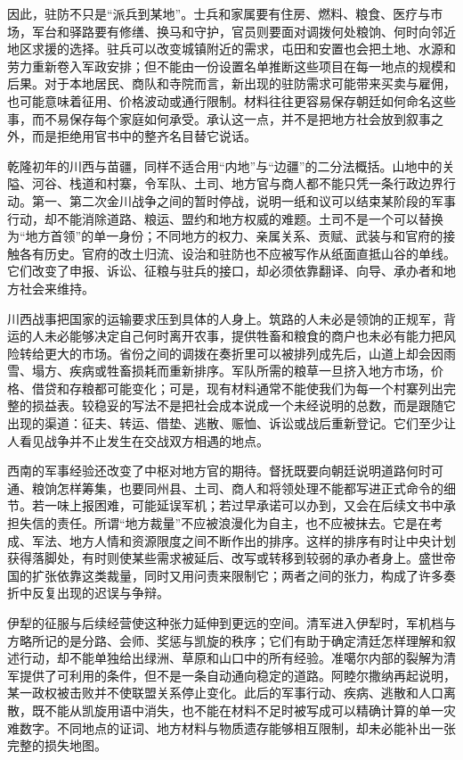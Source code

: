 因此，驻防不只是“派兵到某地”。士兵和家属要有住房、燃料、粮食、医疗与市场，军台和驿路要有修缮、换马和守护，官员则要面对调拨何处粮饷、何时向邻近地区求援的选择。驻兵可以改变城镇附近的需求，屯田和安置也会把土地、水源和劳力重新卷入军政安排；但不能由一份设置名单推断这些项目在每一地点的规模和后果。对于本地居民、商队和寺院而言，新出现的驻防需求可能带来买卖与雇佣，也可能意味着征用、价格波动或通行限制。材料往往更容易保存朝廷如何命名这些事，而不易保存每个家庭如何承受。承认这一点，并不是把地方社会放到叙事之外，而是拒绝用官书中的整齐名目替它说话。

乾隆初年的川西与苗疆，同样不适合用“内地”与“边疆”的二分法概括。山地中的关隘、河谷、栈道和村寨，令军队、土司、地方官与商人都不能只凭一条行政边界行动。第一、第二次金川战争之间的暂时停战，说明一纸和议可以结束某阶段的军事行动，却不能消除道路、粮运、盟约和地方权威的难题。土司不是一个可以替换为“地方首领”的单一身份；不同地方的权力、亲属关系、贡赋、武装与和官府的接触各有历史。官府的改土归流、设治和驻防也不应被写作从纸面直抵山谷的单线。它们改变了申报、诉讼、征粮与驻兵的接口，却必须依靠翻译、向导、承办者和地方社会来维持。

川西战事把国家的运输要求压到具体的人身上。筑路的人未必是领饷的正规军，背运的人未必能够决定自己何时离开农事，提供牲畜和粮食的商户也未必有能力把风险转给更大的市场。省份之间的调拨在奏折里可以被排列成先后，山道上却会因雨雪、塌方、疾病或牲畜损耗而重新排序。军队所需的粮草一旦挤入地方市场，价格、借贷和存粮都可能变化；可是，现有材料通常不能使我们为每一个村寨列出完整的损益表。较稳妥的写法不是把社会成本说成一个未经说明的总数，而是跟随它出现的渠道：征夫、转运、借垫、逃散、赈恤、诉讼或战后重新登记。它们至少让人看见战争并不止发生在交战双方相遇的地点。

西南的军事经验还改变了中枢对地方官的期待。督抚既要向朝廷说明道路何时可通、粮饷怎样筹集，也要同州县、土司、商人和将领处理不能都写进正式命令的细节。若一味上报困难，可能延误军机；若过早承诺可以办到，又会在后续文书中承担失信的责任。所谓“地方裁量”不应被浪漫化为自主，也不应被抹去。它是在考成、军法、地方人情和资源限度之间不断作出的排序。这样的排序有时让中央计划获得落脚处，有时则使某些需求被延后、改写或转移到较弱的承办者身上。盛世帝国的扩张依靠这类裁量，同时又用问责来限制它；两者之间的张力，构成了许多奏折中反复出现的迟误与争辩。

伊犁的征服与后续经营使这种张力延伸到更远的空间。清军进入伊犁时，军机档与方略所记的是分路、会师、奖惩与凯旋的秩序；它们有助于确定清廷怎样理解和叙述行动，却不能单独给出绿洲、草原和山口中的所有经验。准噶尔内部的裂解为清军提供了可利用的条件，但不是一条自动通向稳定的道路。阿睦尔撒纳再起说明，某一政权被击败并不使联盟关系停止变化。此后的军事行动、疾病、逃散和人口离散，既不能从凯旋用语中消失，也不能在材料不足时被写成可以精确计算的单一灾难数字。不同地点的证词、地方材料与物质遗存能够相互限制，却未必能补出一张完整的损失地图。

